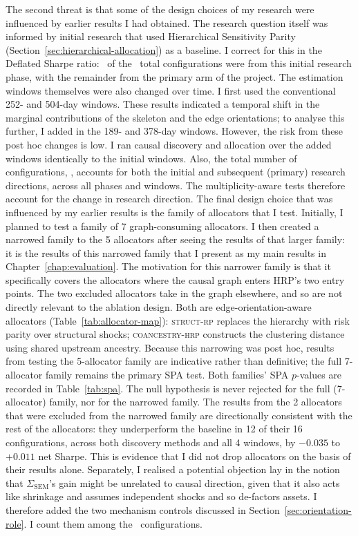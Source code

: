 \documentclass[11pt, a4paper]{report}
\newcommand{\structrp}{\textsc{struct-rp}}
\newcommand{\coanchrp}{\textsc{coancestry-hrp}}
\begin{document}
The second threat is that some of the design choices of my research were influenced by earlier results I had obtained.
The research question itself was informed by initial research that used Hierarchical Sensitivity Parity \cite{rodriguez2023hsp} (Section~\ref{sec:hierarchical-allocation}) as a baseline.
I correct for this in the Deflated Sharpe ratio: \rsNtrialsPhaseI\ of the \rsNtrials\ total configurations were from this initial research phase, with the remainder from the primary arm of the project.
The estimation windows themselves were also changed over time. I first used the conventional 252- and 504-day windows. These results indicated a temporal shift in the marginal contributions of the skeleton and the edge orientations; to analyse this further, I added in the 189- and 378-day windows.
However, the risk from these post hoc changes is low.
I ran causal discovery and allocation over the added windows identically to the initial windows.
Also, the total number of configurations, \rsNtrials, accounts for both the initial and subsequent (primary) research directions, across all phases and windows. The multiplicity-aware tests therefore account for the change in research direction.
The final design choice that was influenced by my earlier results is the family of allocators that I test.
Initially, I planned to test a family of 7 graph-consuming allocators. I then created a narrowed family to the 5 allocators after seeing the results of that larger family: it is the results of this narrowed family that I present as my main results in Chapter~\ref{chap:evaluation}. The motivation for this narrower family is that it specifically covers the allocators where the causal graph enters HRP's two entry points. The two excluded allocators take in the graph elsewhere, and so are not directly relevant to the ablation design. Both are edge-orientation-aware allocators (Table~\ref{tab:allocator-map}): \structrp{} replaces the hierarchy with risk parity over structural shocks; \coanchrp{} constructs the clustering distance using shared upstream ancestry. 
Because this narrowing was post hoc, results from testing the 5-allocator family are indicative rather than definitive; the full 7-allocator family remains the primary SPA test.
Both families' SPA $p$-values are recorded in Table~\ref{tab:spa}.
The null hypothesis is never rejected for the full (7-allocator) family, nor for the narrowed family.
The results from the 2 allocators that were excluded from the narrowed family are directionally consistent with the rest of the allocators: they underperform the baseline in 12 of their 16 configurations, across both discovery methods and all 4 windows, by $-0.035$ to $+0.011$ net Sharpe. This is evidence that I did not drop allocators on the basis of their results alone.
Separately, I realised a potential objection lay in the notion that $\Sigma_{\mathrm{SEM}}$'s gain might be unrelated to causal direction, given that it also acts like shrinkage and assumes independent shocks and so de-factors assets. I therefore added the two mechanism controls discussed in Section~\ref{sec:orientation-role}.
I count them among the \rsNtrials\ configurations.
\end{document}
